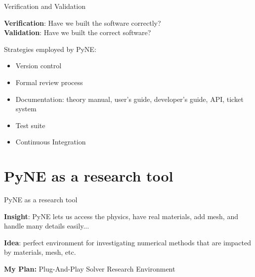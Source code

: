 \documentclass[xcolor=x11names,compress]{beamer}
\renewcommand{\(}{\begin{columns}}
\renewcommand{\)}{\end{columns}}
\newcommand{\<}[1]{\begin{column}{#1}}
\renewcommand{\>}{\end{column}}
\begin{document}
\begin{frame}{Verification and Validation}

    \textbf{Verification}: Have we built the software correctly?\\
    \textbf{Validation}: Have we built the correct software?
    
    \vspace*{1 em}
    Strategies employed by PyNE:
   
    \begin{itemize}
    \item Version control
    \item Formal review process
    \item Documentation: theory manual, user's guide, developer's guide, API, 
    ticket system
    \item Test suite
    \item Continuous Integration
    \end{itemize}

\end{frame}

\section{PyNE as a research tool}  
\begin{frame}{PyNE as a research tool}

    \textbf{Insight}: PyNE lets us access the physics, have real materials, 
    add mesh, and handle many details easily...
    
    	\pause
    \vspace{2 em}
    \textbf{Idea}: perfect environment for investigating numerical methods that 
    are impacted by materials, mesh, etc. 
    
    	\pause
    \vspace{2 em}
    \textbf{My Plan:} Plug-And-Play Solver Research Environment
    
\end{frame}
\end{document}
